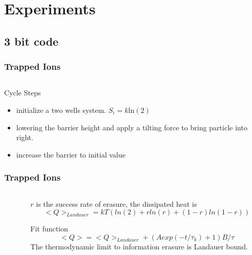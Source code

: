 \documentclass[aspectratio=169,10pt]{beamer}
\begin{document}
\section{Experiments}
\subsection{3 bit code}
\begin{frame}
    \frametitle{Trapped Ions}
    \begin{columns}
        \begin{column}{0.3\textwidth}
            \centering
        \end{column}
        \begin{column}{0.7\textwidth}
            \centering
        \end{column}
    \end{columns}
    \begin{block}{Cycle Steps\cite{berut2012experimental}}
        \begin{itemize}
            \item initialize a two wells system. $S_i=k\mathrm{ln(2)}$
            \item lowering the barrier height and apply a tilting force to bring particle into right.
            \item increase the barrier to initial value
        \end{itemize}
    \end{block}
\end{frame}
\begin{frame}
    \frametitle{Trapped Ions}
    \begin{columns}
        \begin{column}{0.28\textwidth}
            \centering
        \end{column}
        \begin{column}{0.7\textwidth}
            $r$ is the success rate of erasure, the dissipated heat is
            \[<Q>_{Landauer}=kT(ln(2)+rln(r)+(1-r)ln(1-r))\]

            \begin{block}{Fit function}
                \[<Q>=<Q>_{Landauer}+(Aexp(-t/\tau_k)+1)B/\tau\]
                The thermodynamic limit to information erasure is Landauer bound.
            \end{block}
        \end{column}
    \end{columns}
\end{frame}
\end{document}
